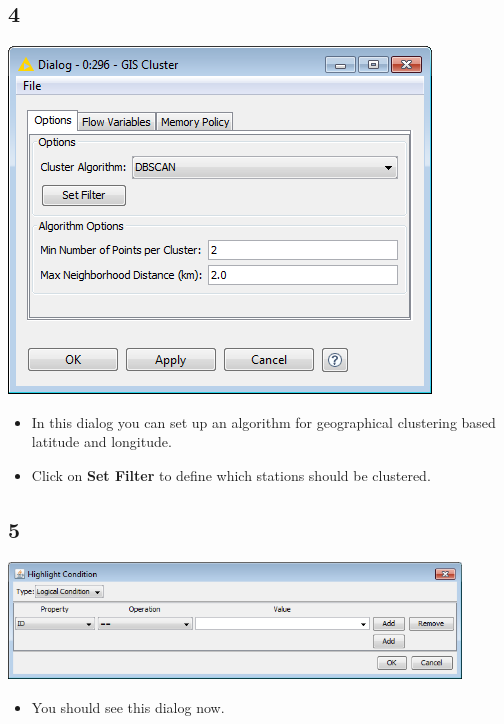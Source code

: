 \documentclass{beamer}
\begin{document}
\subsection{4}
\begin{frame}
	\begin{center}
  		\includegraphics[height=0.6\textheight]{4.png}
	\end{center}
	\begin{itemize}
		\item In this dialog you can set up an algorithm for geographical clustering based latitude and longitude.
		\item Click on \textbf{Set Filter} to define which stations should be clustered.
	\end{itemize}
\end{frame}

\subsection{5}
\begin{frame}
	\begin{center}
  		\includegraphics[width=0.9\textwidth]{5.png}
	\end{center}
	\begin{itemize}
		\item You should see this dialog now.
	\end{itemize}
\end{frame}
\end{document}
